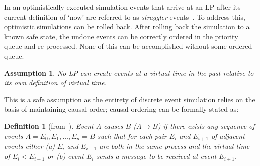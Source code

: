 \documentclass[nonacm,sigconf]{acmart}
\newcommand{\now}{\lq now\rq\xspace}
\newtheorem{definition}{Definition}
\newtheorem{assumption}{Assumption}
\begin{document}
In an optimistically executed simulation events that arrive at an LP after its current definition of \now are referred to as \emph{straggler} events~\cite{fujimoto1990}. To address this, optimistic simulations can be rolled back. After rolling back the simulation to a known safe state, the undone events can be correctly ordered in the priority queue and re-processed. None of this can be accomplished without some ordered queue.

\begin{assumption}\label{as:no-past-events}
  No LP can create events at a virtual time in the past relative to its own definition of virtual time.
\end{assumption}

This is a safe assumption as the entirety of discrete event simulation relies on the basis of maintaining causal-order; causal ordering can be formally stated as:


\begin{definition}[from~\cite{jefferson1985}]\label{def:causal}
  Event $A$ causes $B$ ($A\rightarrow B$) if there exists any sequence of events $A=E_0,E_1,\ldots,E_n=B$ such that for each pair $E_i$ and $E_{i+1}$ of adjacent events either (a) $E_i$ and $E_{i+1}$ are both in the same process and the virtual time of $E_i < E_{i+1}$ or (b) event $E_i$ sends a message to be received at event $E_{i+1}$.
\end{definition}


\end{document}
